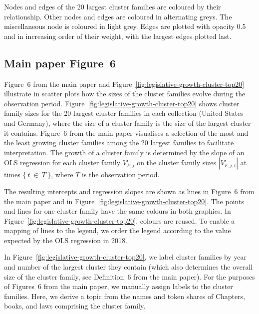 Nodes and edges of the 20 largest cluster families are coloured by their relationship. 
Other nodes and edges are coloured in alternating greys. 
The miscellaneous node is coloured in light grey.
Edges are plotted with opacity $0.5$ and in increasing order of their weight, 
with the largest edges plotted last.



\subsection{Main paper Figure~6} %

Figure~6 from the main paper %
and Figure~\ref{fig:legislative-growth-cluster-top20} illustrate in scatter plots how the sizes of the cluster families evolve during the observation period.
Figure~\ref{fig:legislative-growth-cluster-top20} shows cluster family sizes for the 20 largest cluster families in each collection (United States and Germany),
where the size of a cluster family is the size of the largest cluster it contains. 
Figure~6 from the main paper %
visualises a selection of the most and the least growing cluster families among the 20 largest families to facilitate interpretation. 
The growth of a cluster family is determined by the slope of an OLS regression for each cluster family $V^i_{F,j}$ on the cluster family sizes $|V^i_{F,j,t}|$ at times $\{~t~\in~T~\}$, 
where $T$ is the observation period.

The resulting intercepts and regression slopes are shown as lines in Figure~6 from the main paper %
and in Figure~\ref{fig:legislative-growth-cluster-top20}.
The points and lines for one cluster family have the same colours in both graphics.
In Figure~\ref{fig:legislative-growth-cluster-top20}, 
colours are reused.
To enable a mapping of lines to the legend, 
we order the legend according to the value expected by the OLS regression in 2018.

In Figure~\ref{fig:legislative-growth-cluster-top20}, 
we label cluster families by year and number of the largest cluster they contain (which also determines the overall size of the cluster family, see Definition~6 from the main paper).
For the purposes of Figures~6 from the main paper,  %
we manually assign labels to the cluster families. 
Here, we derive a topic from the names and token shares of Chapters, books, and laws comprising the cluster family.

